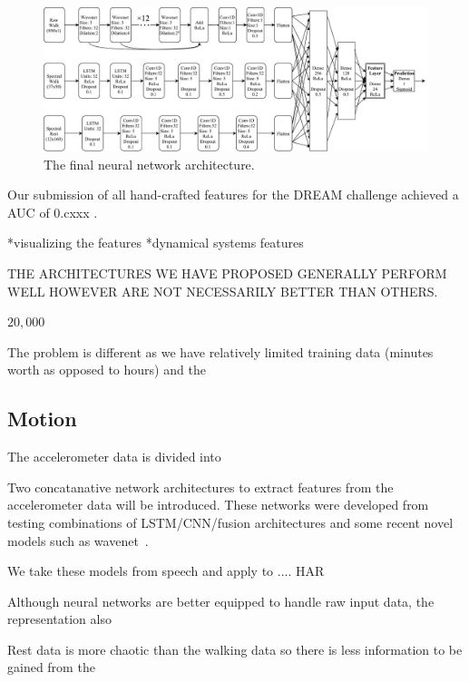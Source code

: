 \documentclass[12pt, twoside]{book}
\begin{document}
\begin{figure}[h]
	\label{finalarchitecture}
	\centering\centerline{\includegraphics[width=1.2\linewidth]{final_architecture.pdf}}
	\caption{The final neural network architecture.}
\end{figure}

Our submission of all hand-crafted features for the DREAM challenge achieved a AUC of 0.cxxx .

*visualizing the features
*dynamical systems features



 THE ARCHITECTURES WE HAVE PROPOSED GENERALLY PERFORM WELL HOWEVER ARE NOT NECESSARILY BETTER THAN OTHERS.

$20,000$


The problem is different as we have relatively limited training data (minutes worth as opposed to hours) and the 






\subsection{Motion}
The accelerometer data is divided into


Two concatanative network architectures to extract features from the accelerometer data will be introduced. These networks were developed from testing combinations of LSTM/CNN/fusion architectures and some recent novel models such as wavenet~\cite{wavenet}. 

We take these models from speech and apply to .... HAR~\cite{deepconvlstm}

Although neural networks are better equipped to handle raw input data, the representation also 


Rest data is more chaotic than the walking data so there is less information to be gained from the 
\end{document}
